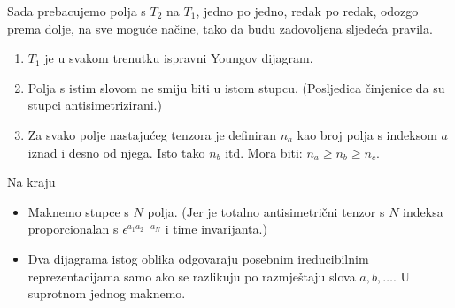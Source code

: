 Sada prebacujemo polja s $T_2$ na $T_1$, jedno po jedno, redak
po redak, odozgo prema dolje, na sve moguće načine, tako da
budu zadovoljena sljedeća pravila.
\begin{enumerate}
\item $T_1$ je u svakom trenutku ispravni Youngov dijagram.
\item Polja s istim slovom ne smiju biti u istom stupcu.
 (Posljedica činjenice da su stupci antisimetrizirani.)
\item Za svako polje nastajućeg tenzora je definiran $n_a$
kao broj polja s indeksom $a$ iznad i desno od njega.
Isto tako $n_b$ itd. Mora biti: $n_a \ge n_b \ge n_c$.
\end{enumerate}
Na kraju 
\begin{itemize}
\item Maknemo stupce s $N$ polja. (Jer je totalno
antisimetrični tenzor s $N$ indeksa proporcionalan
s $\epsilon^{a_1 a_2 \cdots a_N}$ i time 
invarijanta.)
\item Dva dijagrama istog oblika  odgovaraju
posebnim ireducibilnim reprezentacijama samo ako se razlikuju po razmještaju
slova $a,b,\dots$. U suprotnom jednog maknemo.
\end{itemize}

